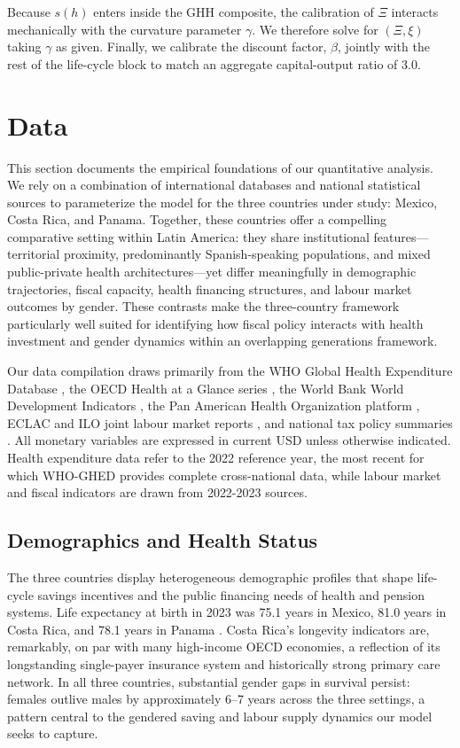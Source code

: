 \documentclass[12pt,a4paper]{article}
\begin{document}
Because $s(h)$ enters inside the GHH composite, the calibration of $\Xi$ interacts mechanically with the curvature parameter $\gamma$. We therefore solve for $(\Xi,\xi)$ taking $\gamma$ as given. Finally, we calibrate the discount factor, $\beta$, jointly with the rest of the life-cycle block to match an aggregate capital-output ratio of $3.0$.


\section{Data}\label{sec:data}

This section documents the empirical foundations of our quantitative
analysis. We rely on a combination of international databases and
national statistical sources to parameterize the model for the three
countries under study: Mexico, Costa Rica, and Panama. Together, these
countries offer a compelling comparative setting within Latin America:
they share institutional features---territorial proximity,
predominantly Spanish-speaking populations, and mixed public-private
health architectures---yet differ meaningfully in demographic
trajectories, fiscal capacity, health financing structures, and labour
market outcomes by gender. These contrasts make the three-country
framework particularly well suited for identifying how fiscal policy
interacts with health investment and gender dynamics within an
overlapping generations framework.

Our data compilation draws primarily from the WHO Global Health
Expenditure Database \citep{WHOGHED2024}, the OECD Health at a Glance
series \citep{OECDHaG2023}, the World Bank World Development
Indicators \citep{WorldBankWDI2024}, the Pan American Health
Organization platform \citep{PAHOHIA2024}, ECLAC and ILO joint labour
market reports \citep{ECLACILO2023}, and national tax policy summaries
\citep{PwCWWTS2024, OECDRevStats2024}. All monetary variables are
expressed in current USD unless otherwise indicated. Health expenditure
data refer to the 2022 reference year, the most recent for which
WHO-GHED provides complete cross-national data, while labour market
and fiscal indicators are drawn from 2022-2023 sources.

\subsection{Demographics and Health Status}\label{subsec:demog}

The three countries display heterogeneous demographic profiles that
shape life-cycle savings incentives and the public financing needs of
health and pension systems. Life expectancy at birth in 2023 was 75.1
years in Mexico, 81.0 years in Costa Rica, and 78.1 years in Panama
\citep{PAHOHIA2024, WHOGHO2024}. Costa Rica's longevity indicators are,
remarkably, on par with many high-income OECD economies, a reflection
of its longstanding single-payer insurance system and historically
strong primary care network. In all three countries, substantial gender
gaps in survival persist: females outlive males by approximately 6--7
years across the three settings, a pattern central to the gendered
saving and labour supply dynamics our model seeks to capture.
\end{document}
